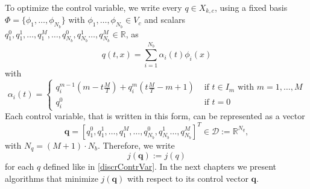 To optimize the control variable, we write every $q\in X_{k,c}$, using a fixed basis $\Phi=\{\phi_1,\dotsc,\phi_{N_b}\}$ with $\phi_1,\dotsc,\phi_{N_b}\in V_c$ and scalars $q_1^0,q_1^1,\dotsc,q_1^M,\dotsc,q_{N_b}^0,q_{N_b}^1\dotsc,q_{N_b}^M\in\mathbb{R}$, as
\begin{equation}
\label{discrContrVar}
q(t,x) = \sum_{i=1}^{N_b}\alpha_i(t)\phi_i(x)
\end{equation} 
with
\begin{displaymath}
\alpha_i(t)=\begin{cases}
q_i^{m-1}\left(m-t\frac{M}{T}\right) + q_i^m\left(t\frac{M}{T}-m+1\right) & \text{ if $t\in I_m$ with $m=1,\dotsc,M$}\\
q_i^0 & \text{ if $t=0$}
\end{cases}
\end{displaymath}
Each control variable, that is written in this form, can be represented as a vector
\begin{displaymath}
\mathbf{q}=\left[q_1^0,q_1^1,\dotsc,q_1^M,\dotsc,q_{N_b}^0,q_{N_b}^1\dotsc,q_{N_b}^M\right]^T\in\mathcal{D}:=\mathbb{R}^{N_q},
\end{displaymath} 
with $N_q = (M+1)\cdot N_b$. Therefore, we write
\begin{displaymath}
j(\mathbf{q}):=j(q)
\end{displaymath}
for each $q$ defined like in \eqref{discrContrVar}. In the next chapters we present algorithms that minimize $j(\mathbf{q})$ with respect to its control vector $\mathbf{q}$.
































































